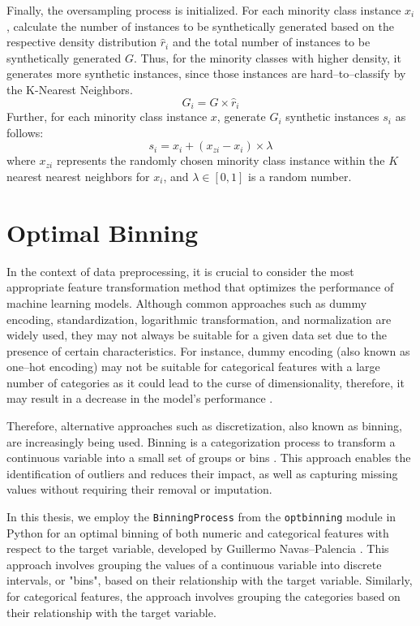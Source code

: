 Finally, the oversampling process is initialized.
For each minority class instance $x_i$, calculate the number of instances to be synthetically generated based on the respective density distribution $\hat{r}_i$ and the total number of instances to be synthetically generated $G$. Thus, for the minority classes with higher density, it generates more synthetic instances, since those instances are hard--to--classify by the K-Nearest Neighbors.
\begin{equation}\label{eq}
G_i = G \times \hat{r}_{i}
\end{equation}
Further, for each minority class instance $x$, generate $G_i$ synthetic instances $s_i$ as follows:
\begin{equation}\label{eq}
s_i = x_i + \left(x_{zi} - x_{i} \right) \times \lambda
\end{equation}
where $x_{zi}$ represents the randomly chosen minority class instance within the $K$ nearest nearest neighbors for $x_i$, and $\lambda \in \left[0,1\right]$ is a random number.

\newpage
\section{Optimal Binning}
\label{sec:optbinningtheory}
In the context of data preprocessing, it is crucial to consider the most appropriate feature transformation method that optimizes the performance of machine learning models.
Although common approaches such as dummy encoding, standardization, logarithmic transformation, and normalization are widely used, they may not always be suitable for a given data set due to the presence of certain characteristics.
For instance, dummy encoding (also known as one--hot encoding) may not be suitable for categorical features with a large number of categories as it could lead to the curse of dimensionality, therefore, it may result in a decrease in the model's performance \citep{bera2021dimensionality}.


Therefore, alternative approaches such as discretization, also known as binning, are increasingly being used. Binning is a categorization process to transform a continuous variable into a small set of groups or bins \citep{zeng2014necessary}. This approach enables the identification of outliers and reduces their impact, as well as capturing missing values without requiring their removal or imputation.


In this thesis, we employ the \lstinline{BinningProcess} from the \lstinline{optbinning} module in Python for an optimal binning of both numeric and categorical features with respect to the target variable, developed by Guillermo Navas--Palencia \citep{navas2020optimal}.
This approach involves grouping the values of a continuous variable into discrete intervals, or "bins", based on their relationship with the target variable.
Similarly, for categorical features, the approach involves grouping the categories based on their relationship with the target variable.

